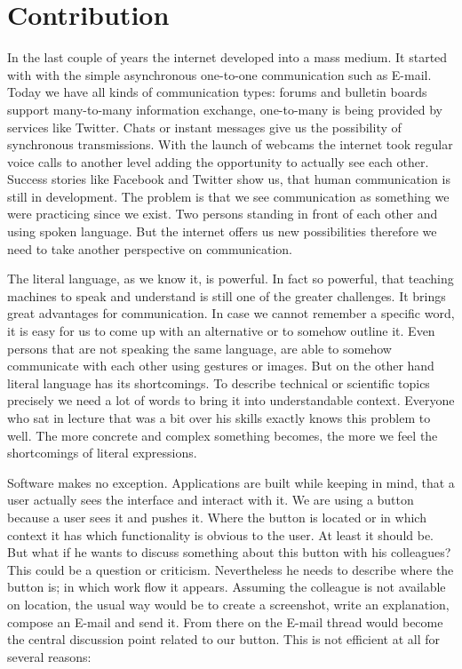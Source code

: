 \section{Contribution}\label{contribution}

In the last couple of years the internet developed into a mass medium. It started with with the simple asynchronous one-to-one communication such as E-mail. Today we have all kinds of communication types: forums and bulletin boards support many-to-many information exchange, one-to-many is being provided by services like Twitter. Chats or instant messages give us the possibility of synchronous transmissions. With the launch of webcams the internet took regular voice calls to another level adding the opportunity to actually see each other. Success stories like Facebook and Twitter show us, that human communication is still in development. The problem is that we see communication as something we were practicing since we exist. Two persons standing in front of each other and using spoken language. But the internet offers us new possibilities therefore we need to take another perspective on communication. 

The literal language, as we know it, is powerful. In fact so powerful, that teaching machines to speak and understand is still one of the greater challenges. It brings great advantages for communication. In case we cannot remember a specific word, it is easy for us to come up with an alternative or to somehow outline it. Even persons that are not speaking the same language, are able to somehow communicate with each other using gestures or images. But on the other hand literal language has its shortcomings. To describe technical or scientific topics precisely we need a lot of words to bring it into understandable context. Everyone who sat in lecture that was a bit over his skills exactly knows this problem to well. The more concrete and complex something becomes, the more we feel the shortcomings of literal expressions. 

Software makes no exception. Applications are built while keeping in mind, that a user actually sees the interface and interact with it. We are using a button because a user sees it and pushes it. Where the button is located or in which context it has which functionality is obvious to the user. At least it should be. But what if he wants to discuss something about this button with his colleagues? This could be a question or criticism. Nevertheless he needs to describe where the button is; in which work flow it appears. Assuming the colleague is not available on location, the usual way would be to create a screenshot, write an explanation, compose an E-mail and send it. From there on the E-mail thread would become the central discussion point related to our button. This is not efficient at all for several reasons:

